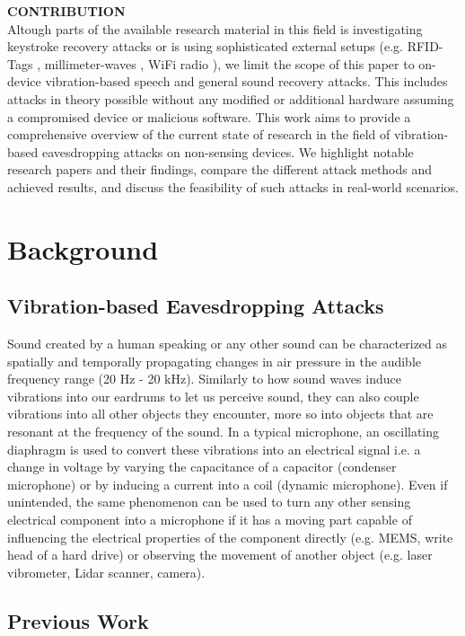 \documentclass[sigconf, nonacm]{acmart}
\begin{document}
\textbf{CONTRIBUTION}\\
Altough parts of the available research material in this field is investigating keystroke recovery attacks \cite{Touchtone2023}\cite{TouchLogger2011}\cite{TapLogger2012} or is using sophisticated external setups (e.g. RFID-Tags \cite{RFMic2023}, millimeter-waves \cite{MMMic2022}, WiFi radio \cite{ART2015}), we limit the scope of this paper to on-device vibration-based speech and general sound recovery attacks.
This includes attacks in theory possible without any modified or additional hardware assuming a compromised device or malicious software.
This work aims to provide a comprehensive overview of the current state of research in the field of vibration-based eavesdropping attacks on non-sensing devices.
We highlight notable research papers and their findings, compare the different attack methods and achieved results, and discuss the feasibility of such attacks in real-world scenarios.

\section{Background}
\subsection{Vibration-based Eavesdropping Attacks}
Sound created by a human speaking or any other sound can be characterized as spatially and temporally propagating changes in air pressure in the audible frequency range (20 Hz - 20 kHz).
Similarly to how sound waves induce vibrations into our eardrums to let us perceive sound, they can also couple vibrations into all other objects they encounter, more so into objects that are resonant at the frequency of the sound.
In a typical microphone, an oscillating diaphragm is used to convert these vibrations into an electrical signal i.e. a change in voltage by varying the capacitance of a capacitor (condenser microphone) or by inducing a current into a coil (dynamic microphone).
Even if unintended, the same phenomenon can be used to turn any other sensing electrical component into a microphone if it has a moving part capable of influencing the electrical properties of the component directly (e.g. MEMS, write head of a hard drive) or observing the movement of another object (e.g. laser vibrometer, Lidar scanner, camera).

\subsection{Previous Work}
\end{document}
